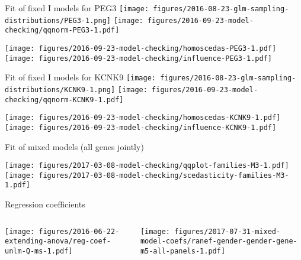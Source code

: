 \documentclass{beamer}
\begin{document}
\begin{frame}{Fit of fixed I models for PEG3}
\texttt{[image: figures/2016-08-23-glm-sampling-distributions/PEG3-1.png]}
\texttt{[image: figures/2016-09-23-model-checking/qqnorm-PEG3-1.pdf]}

\texttt{[image: figures/2016-09-23-model-checking/homoscedas-PEG3-1.pdf]}
\texttt{[image: figures/2016-09-23-model-checking/influence-PEG3-1.pdf]}
\end{frame}

\begin{frame}{Fit of fixed I models for KCNK9}
\texttt{[image: figures/2016-08-23-glm-sampling-distributions/KCNK9-1.png]}
\texttt{[image: figures/2016-09-23-model-checking/qqnorm-KCNK9-1.pdf]}

\texttt{[image: figures/2016-09-23-model-checking/homoscedas-KCNK9-1.pdf]}
\texttt{[image: figures/2016-09-23-model-checking/influence-KCNK9-1.pdf]}
\end{frame}

\begin{frame}{Fit of mixed models (all genes jointly)}
\begin{center}
\texttt{[image: figures/2017-03-08-model-checking/qqplot-families-M3-1.pdf]}
\texttt{[image: figures/2017-03-08-model-checking/scedasticity-families-M3-1.pdf]}
\end{center}
\end{frame}

\begin{frame}{Regression coefficients}
\begin{columns}[t]
\begin{column}{0.5\textwidth}

\texttt{[image: figures/2016-06-22-extending-anova/reg-coef-unlm-Q-ms-1.pdf]}
\end{column}

\begin{column}{0.5\textwidth}

\texttt{[image: figures/2017-07-31-mixed-model-coefs/ranef-gender-gender-gene-m5-all-panels-1.pdf]}
\end{column}
\end{columns}
\end{frame}
\end{document}
